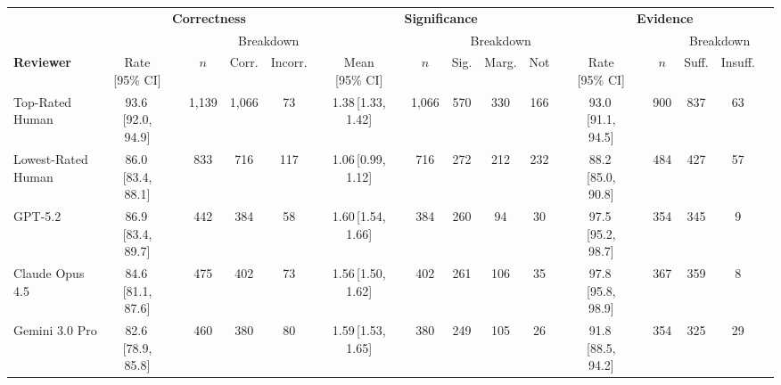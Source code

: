 \begin{table}[t]
\centering
\fontsize{7}{9.5}\selectfont
\setlength{\tabcolsep}{3pt}
\begin{tabular}{l cc c cc cc c cccc cc c cc cc}
\toprule
& \multicolumn{5}{c}{\textbf{Correctness}} & & \multicolumn{6}{c}{\textbf{Significance}} & & \multicolumn{5}{c}{\textbf{Evidence}} \\
\cmidrule(lr){2-6} \cmidrule(lr){8-13} \cmidrule(lr){15-19}
& & & & \multicolumn{2}{c}{\scriptsize Breakdown} & & & & & \multicolumn{3}{c}{\scriptsize Breakdown} & & & & & \multicolumn{2}{c}{\scriptsize Breakdown} \\
\cmidrule(lr){5-6} \cmidrule(lr){11-13} \cmidrule(lr){18-19}
\textbf{Reviewer} & {\scriptsize Rate [95\% CI]} & & $n$ & {\scriptsize Corr.} & {\scriptsize Incorr.} & & {\scriptsize Mean [95\% CI]} & & $n$ & {\scriptsize Sig.} & {\scriptsize Marg.} & {\scriptsize Not} & & {\scriptsize Rate [95\% CI]} & & $n$ & {\scriptsize Suff.} & {\scriptsize Insuff.} \\
\midrule
Top-Rated Human    & 93.6{\scriptsize\,[92.0, 94.9]} & & 1{,}139 & {\scriptsize 1{,}066} & {\scriptsize 73}  & & 1.38{\scriptsize\,[1.33, 1.42]} & & 1{,}066 & {\scriptsize 570} & {\scriptsize 330} & {\scriptsize 166} & & 93.0{\scriptsize\,[91.1, 94.5]} & & 900 & {\scriptsize 837} & {\scriptsize 63} \\
Lowest-Rated Human & 86.0{\scriptsize\,[83.4, 88.1]} & & 833     & {\scriptsize 716}     & {\scriptsize 117} & & 1.06{\scriptsize\,[0.99, 1.12]} & & 716     & {\scriptsize 272} & {\scriptsize 212} & {\scriptsize 232} & & 88.2{\scriptsize\,[85.0, 90.8]} & & 484 & {\scriptsize 427} & {\scriptsize 57} \\
GPT-5.2            & 86.9{\scriptsize\,[83.4, 89.7]} & & 442     & {\scriptsize 384}     & {\scriptsize 58}  & & 1.60{\scriptsize\,[1.54, 1.66]} & & 384     & {\scriptsize 260} & {\scriptsize 94}  & {\scriptsize 30}  & & 97.5{\scriptsize\,[95.2, 98.7]} & & 354 & {\scriptsize 345} & {\scriptsize 9} \\
Claude Opus 4.5    & 84.6{\scriptsize\,[81.1, 87.6]} & & 475     & {\scriptsize 402}     & {\scriptsize 73}  & & 1.56{\scriptsize\,[1.50, 1.62]} & & 402     & {\scriptsize 261} & {\scriptsize 106} & {\scriptsize 35}  & & 97.8{\scriptsize\,[95.8, 98.9]} & & 367 & {\scriptsize 359} & {\scriptsize 8} \\
Gemini 3.0 Pro     & 82.6{\scriptsize\,[78.9, 85.8]} & & 460     & {\scriptsize 380}     & {\scriptsize 80}  & & 1.59{\scriptsize\,[1.53, 1.65]} & & 380     & {\scriptsize 249} & {\scriptsize 105} & {\scriptsize 26}  & & 91.8{\scriptsize\,[88.5, 94.2]} & & 354 & {\scriptsize 325} & {\scriptsize 29} \\

\end{tabular}
\end{table}
